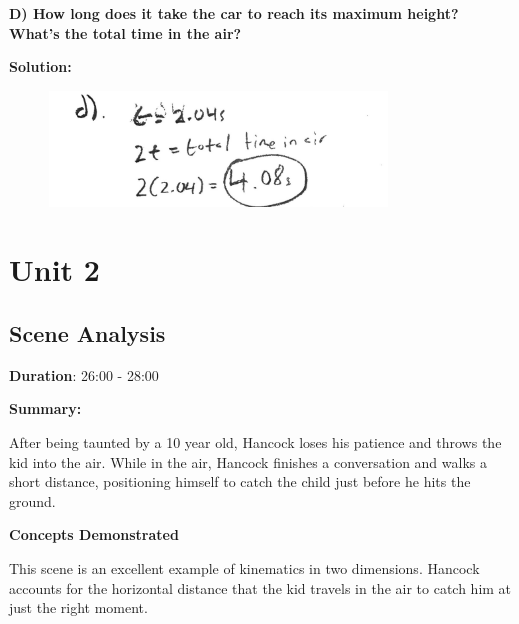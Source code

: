 \documentclass[a4paper,12pt]{article}
\begin{document}

\noindent\textbf{D) How long does it take the car to reach its maximum height? What's the total time in the air?} \\

\vspace{-0.2cm}

\noindent\textbf{Solution:}

\begin{figure}[H]
    \centering
    \includegraphics[width=0.8\textwidth]{U1_P2_D} %
\end{figure}

\newpage


\section{Unit 2}

\vspace{-0.5cm}
\singlespacing

\subsection{Scene Analysis}

\textbf{Duration}: 26:00 - 28:00

\vspace{0.3cm}
\noindent\textbf{Summary:} \par
After being taunted by a 10 year old, Hancock loses his patience and throws the kid into the air. While in the air, Hancock finishes a conversation and walks a short distance, positioning himself to catch the child just before he hits the ground.
\par


\vspace{0.3cm}
\noindent\textbf{Concepts Demonstrated} \par
This scene is an excellent example of kinematics in two dimensions. Hancock accounts for the horizontal distance that the kid travels in the air to catch him at just the right moment.  
\end{document}
